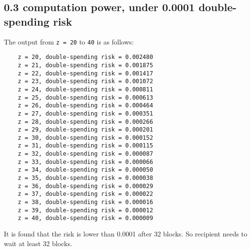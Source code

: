 \documentclass{article}
\begin{document}
\subsection{0.3 computation power, under 0.0001 double-spending risk}
The output from \verb|z = 20| to \verb|40| is as follows:\\
\begin{verbatim}
    z = 20, double-spending risk = 0.002480
    z = 21, double-spending risk = 0.001875
    z = 22, double-spending risk = 0.001417
    z = 23, double-spending risk = 0.001072
    z = 24, double-spending risk = 0.000811
    z = 25, double-spending risk = 0.000613
    z = 26, double-spending risk = 0.000464
    z = 27, double-spending risk = 0.000351
    z = 28, double-spending risk = 0.000266
    z = 29, double-spending risk = 0.000201
    z = 30, double-spending risk = 0.000152
    z = 31, double-spending risk = 0.000115
    z = 32, double-spending risk = 0.000087
    z = 33, double-spending risk = 0.000066
    z = 34, double-spending risk = 0.000050
    z = 35, double-spending risk = 0.000038
    z = 36, double-spending risk = 0.000029
    z = 37, double-spending risk = 0.000022
    z = 38, double-spending risk = 0.000016
    z = 39, double-spending risk = 0.000012
    z = 40, double-spending risk = 0.000009
\end{verbatim}
It is found that the risk is lower than 0.0001 after 32 blocks. So recipient needs to wait at least 32 blocks.
\end{document}
